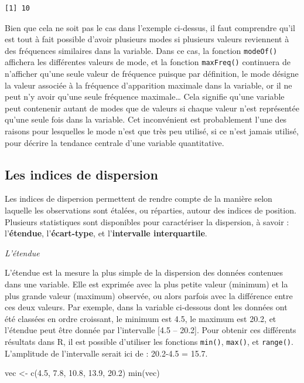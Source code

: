 \documentclass[
  letterpaper,
]{book}
\newenvironment{Shaded}{\begin{snugshade}}{\end{snugshade}}
\newcommand{\FloatTok}[1]{\textcolor[rgb]{0.68,0.00,0.00}{#1}}
\newcommand{\FunctionTok}[1]{\textcolor[rgb]{0.28,0.35,0.67}{#1}}
\newcommand{\NormalTok}[1]{\textcolor[rgb]{0.00,0.23,0.31}{#1}}
\newcommand{\OtherTok}[1]{\textcolor[rgb]{0.00,0.23,0.31}{#1}}
\begin{document}
\begin{verbatim}
[1] 10
\end{verbatim}

Bien que cela ne soit pas le cas dans l'exemple ci-dessus, il faut
comprendre qu'il est tout à fait possible d'avoir plusieurs modes si
plusieurs valeurs reviennent à des fréquences similaires dans la
variable. Dans ce cas, la fonction \texttt{modeOf()} affichera les
différentes valeurs de mode, et la fonction \texttt{maxFreq()}
continuera de n'afficher qu'une seule valeur de fréquence puisque par
définition, le mode désigne la valeur associée à la fréquence
d'apparition maximale dans la variable, or il ne peut n'y avoir qu'une
seule fréquence maximale\ldots{} Cela signifie qu'une variable peut
contenenir autant de modes que de valeurs si chaque valeur n'est
représentée qu'une seule fois dans la variable. Cet inconvénient est
probablement l'une des raisons pour lesquelles le mode n'est que très
peu utilisé, si ce n'est jamais utilisé, pour décrire la tendance
centrale d'une variable quantitative.

\subsection{Les indices de dispersion}\label{les-indices-de-dispersion}

Les indices de dispersion permettent de rendre compte de la manière
selon laquelle les observations sont étalées, ou réparties, autour des
indices de position. Plusieurs statistiques sont disponibles pour
caractériser la dispersion, à savoir : l'\textbf{étendue},
l'\textbf{écart-type}, et l'\textbf{intervalle interquartile}.

\emph{L'étendue}

L'étendue est la mesure la plus simple de la dispersion des données
contenues dans une variable. Elle est exprimée avec la plus petite
valeur (minimum) et la plus grande valeur (maximum) observée, ou alors
parfois avec la différence entre ces deux valeurs. Par exemple, dans la
variable ci-dessous dont les données ont été classées en ordre
croissant, le minimum est 4.5, le maximum est 20.2, et l'étendue peut
être donnée par l'intervalle {[}4.5 -- 20.2{]}. Pour obtenir ces
différents résultats dans R, il est possible d'utiliser les fonctions
\texttt{min()}, \texttt{max()}, et \texttt{range()}. L'amplitude de
l'intervalle serait ici de : 20.2-4.5 = 15.7.

\begin{Shaded}
\begin{Highlighting}[]
\NormalTok{vec }\OtherTok{\textless{}{-}} \FunctionTok{c}\NormalTok{(}\FloatTok{4.5}\NormalTok{, }\FloatTok{7.8}\NormalTok{, }\FloatTok{10.8}\NormalTok{, }\FloatTok{13.9}\NormalTok{, }\FloatTok{20.2}\NormalTok{)}
\FunctionTok{min}\NormalTok{(vec)}
\end{Highlighting}
\end{Shaded}
\end{document}

